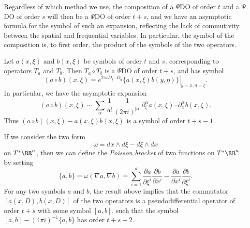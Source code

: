 Regardless of which method we use, the composition of a $\Psi$DO of order $t$ and a $\Psi$DO of order $s$ will then be a $\Psi$DO of order $t + s$, and we have an asymptotic formula for the symbol of such an expansion, reflecting the lack of commutivity between the spatial and frequential variables. In particular, the symbol of the composition is, to first order, the product of the symbols of the two operators.

\begin{theorem}
    Let $a(x,\xi)$ and $b(x,\xi)$ be symbols of order $t$ and $s$, corresponding to operators $T_a$ and $T_b$. Then $T_a \circ T_b$ is a $\Psi$DO of order $t + s$, and has symbol
    \[ (a \circ b)(x, \xi) = \left. e^{2 \pi i D_\xi \cdot D_y} \{ a(x,\xi) b(y,\eta) \} \right|_{y = x, \eta = \xi}. \]
    In particular, we have the asymptotic expansion
    \[ (a \circ b)(x,\xi) \sim \sum_\alpha \frac{1}{\alpha!} \frac{1}{(2 \pi i)^{|\alpha|}} \partial^\alpha_\xi a(x,\xi) \cdot \partial^\alpha_x b(x,\xi). \]
    Thus $(a \circ b)(x,\xi) - a(x,\xi) b(x,\xi)$ is a symbol of order $t + s - 1$.
\end{theorem}

\begin{remark}
    If we consider the two form
    \[ \omega = dx \wedge d \xi - d\xi \wedge dx \]
    on $T^* \RR^n$, then we can define the \emph{Poisson bracket} of two functions on $T^* \RR^n$ by setting
    \[ \{ a, b \} = \omega ( \nabla a, \nabla b ) = \sum_{i = 1}^d \frac{\partial a}{\partial \xi^i} \frac{\partial b}{\partial x^i} - \frac{\partial a}{\partial x^i} \frac{\partial b}{\partial \xi^i}. \]
    For any two symbols $a$ and $b$, the result above implies that the commutator $[a(x,D), b(x,D)]$ of the two operators is a pseudodifferential operator of order $t + s$ with some symbol $[a,b]$, such that the symbol $[a,b] - (4 \pi i)^{-1} \{ a, b \}$ has order $t + s - 2$.
\end{remark}

